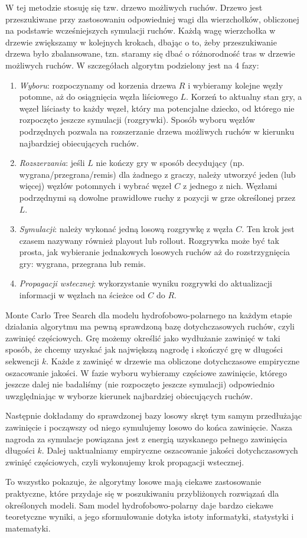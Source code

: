 \documentclass[leqno,10pt]{article}
\begin{document}
W tej metodzie stosuję się tzw. drzewo możliwych ruchów. Drzewo jest przeszukiwane przy zastosowaniu odpowiedniej wagi dla wierzchołków, obliczonej na podstawie wcześniejszych symulacji ruchów. Każdą wagę wierzchołka w drzewie zwiększamy w kolejnych krokach, dbając o to, żeby przeszukiwanie drzewa było zbalansowane, tzn. staramy się dbać o różnorodność tras w drzewie możliwych ruchów. W szczegółach algorytm podzielony jest na 4 fazy: 
\begin{enumerate}
\item \textit{Wyboru}: rozpoczynamy od korzenia drzewa $R$ i wybieramy kolejne węzły potomne, aż do osiągnięcia węzła liściowego $L$. Korzeń to aktualny stan gry, a węzeł liściasty to każdy węzeł, który ma potencjalne dziecko, od którego nie rozpoczęto jeszcze symulacji (rozgrywki). Sposób wyboru węzłów podrzędnych pozwala na rozszerzanie drzewa możliwych ruchów w kierunku najbardziej obiecujących ruchów.
\item \textit{Rozszerzania}: jeśli $L$ nie kończy gry w sposób decydujący (np. wygrana/przegrana/remis) dla żadnego z graczy, należy utworzyć jeden (lub więcej) węzłów potomnych i wybrać węzeł $C$ z jednego z nich. Węzłami podrzędnymi są dowolne prawidłowe ruchy z pozycji w grze określonej przez $L$.
\item  \textit{Symulacji}: należy wykonać jedną losową rozgrywkę z węzła $C$. Ten krok jest czasem nazywany również playout lub rollout. Rozgrywka może być tak prosta, jak wybieranie jednakowych losowych ruchów aż do rozstrzygnięcia gry: wygrana, przegrana lub remis.
\item \textit{Propagacji wstecznej}: wykorzystanie wyniku rozgrywki do aktualizacji informacji w węzłach na ścieżce od $C$ do $R$.
\end{enumerate}
Monte Carlo Tree Search dla modelu hydrofobowo-polarnego na każdym etapie działania algorytmu ma pewną sprawdzoną bazę dotychczasowych ruchów, czyli zawinięć częściowych. Grę możemy określić jako wydłużanie zawinięć w taki sposób, że chcemy uzyskać jak największą nagrodę i skończyć grę w długości sekwencji $k$. Każde z zawinięć w drzewie ma obliczone dotychczasowe empiryczne oszacowanie jakości. W fazie wyboru wybieramy częściowe zawinięcie, którego jeszcze dalej nie badaliśmy (nie rozpoczęto jeszcze symulacji) odpowiednio uwzględniając w wyborze kierunek najbardziej obiecujących ruchów. 

Następnie dokładamy do sprawdzonej bazy losowy skręt tym samym przedłużając zawinięcie i począwszy od niego symulujemy losowo do końca zawinięcie. Nasza nagroda za symulacje powiązana jest z energią uzyskanego pełnego zawinięcia długości $k$. Dalej uaktualniamy empiryczne oszacowanie jakości dotychczasowych zwinięć częściowych, czyli wykonujemy krok propagacji wstecznej.   

To wszystko pokazuje, że algorytmy losowe mają ciekawe zastosowanie praktyczne, które przydaje się w poszukiwaniu przybliżonych rozwiązań dla określonych modeli. Sam model hydrofobowo-polarny daje bardzo ciekawe teoretyczne wyniki, a jego sformułowanie dotyka istoty informatyki, statystyki i matematyki.  
\end{document}

